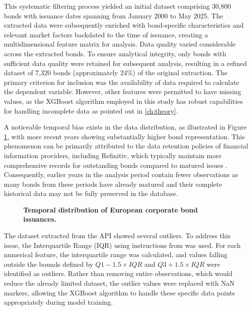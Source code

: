 This systematic filtering process yielded an initial dataset comprising 30,800 bonds with issuance dates spanning from January 2000 to May 2025. The extracted data were subsequently enriched with bond-specific characteristics and relevant market factors backdated to the time of issuance, creating a multidimensional feature matrix for analysis. Data quality varied considerable across the extracted bonds. To ensure analytical integrity, only bonds with sufficient data quality were retained for subsequent analysis, resulting in a refined dataset of 7,320 bonds (approximately 24\%) of the original extraction. The primary criterion for inclusion was the availability of data required to calculate the dependent variable. However, other features were permitted to have missing values, as the XGBoost algorithm employed in this study has robust capabilities for handling incomplete data as pointed out in \ref{ch:theory}.

A noticeable temporal bias exists in the data distribution, as illustrated in Figure \ref{fig:data_availability}, with more recent years showing substantially higher bond representation. This phenomenon can be primarily attributed to the data retention policies of financial information providers, including Refinitiv, which typically maintain more comprehensive records for outstanding bonds compared to matured issues \parencite{Faberov2021RetrieveBond}. Consequently, earlier years in the analysis period contain fewer observations as many bonds from these periods have already matured and their complete historical data may not be fully preserved in the database.

\begin{figure}[h]
    \begin{center}
        
    \end{center}
    \caption{\textbf{Temporal distribution of European corporate bond issuances.}}
    \label{fig:data_availability}
\end{figure}

The dataset extracted from the API showed several outliers. To address this issue, the Interquartile Range (IQR) using instructions from \textcite{Patil2023OutlierMethod} was used. For each numerical feature, the interquartile range was calculated, and values falling outside the bounds defined by $Q1 - 1.5 \times IQR$ and $Q3 + 1.5 \times IQR$ were identified as outliers. Rather than removing entire observations, which would reduce the already limited dataset, the outlier values were replaced with NaN markers, allowing the XGBoost algorithm to handle these specific data points appropriately during model training.


